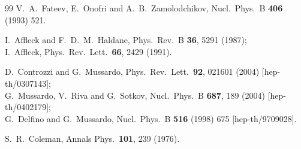 \begin{thebibliography} {99}
V.~A.~Fateev, E.~Onofri and A.~B.~Zamolodchikov,
Nucl.\ Phys.\ B {\bf 406} (1993) 521.

I.~Affleck and F.~D.~M.~Haldane,
Phys.\ Rev.\ B {\bf 36}, 5291 (1987);\\
I.~Affleck,
Phys.\ Rev.\ Lett.\  {\bf 66}, 2429 (1991).

D.~Controzzi and G.~Mussardo,
Phys.\ Rev.\ Lett.\  {\bf 92}, 021601 (2004)
[hep-th/0307143];\\
G.~Mussardo, V.~Riva and G.~Sotkov,
Nucl.\ Phys.\ B {\bf 687}, 189 (2004)
[hep-th/0402179];\\
G.~Delfino and G.~Mussardo,
Nucl.\ Phys.\ B {\bf 516} (1998) 675
[hep-th/9709028].

S.~R.~Coleman,
Annals Phys.\  {\bf 101}, 239 (1976).


\end{thebibliography}





